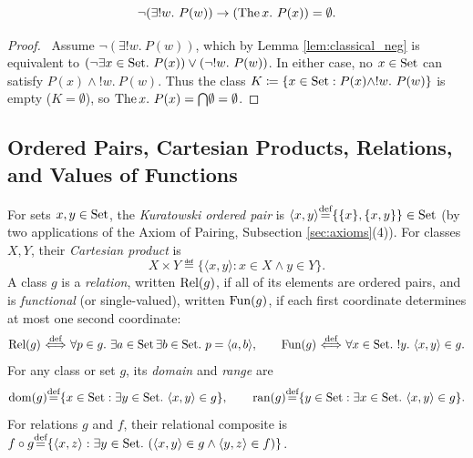 \documentclass[10pt,a4paper]{article}
\renewcommand{\myprf}{\begin{proof}}
\renewcommand{\myqed}{\end{proof}}
\begin{document}
\begin{lemma}\label{lem:the_default}
$$\neg (\exists !w.\ P(w)) \to ({\textrm{The\,}} x.\ P(x)) = \emptyset.$$
\end{lemma}
\myprf\ Assume $\neg (\exists !w.\ P(w))$, which by Lemma \ref{lem:classical_neg} is equivalent to $(\neg \exists x \in {\textrm{Set}}.\ P(x)) \lor (\neg !w.\ P(w))$. In either case, no $x \in {\textrm{Set}}$ can satisfy $P(x) \land !w.\ P(w)$. Thus the class $K \coloneqq \{x \in {\textrm{Set}} : P(x) \land !w.\ P(w)\}$ is empty ($K = \emptyset$), so ${\textrm{The\,}} x.\ P(x) = {\bigcap} \emptyset = \emptyset$. \myqed

\subsection{Ordered Pairs, Cartesian Products, Relations, and Values of Functions}\label{sec:pairs_rels}
\begin{definition}\label{def:pair_rel}
For sets $x, y \in {\textrm{Set}}$, the \emph{Kuratowski ordered pair} is $\langle x, y \rangle {\stackrel{{\textrm{def}}}{=}} \{\{x\}, \{x, y\}\} \in {\textrm{Set}}$ (by two applications of the Axiom of Pairing, Subsection \ref{sec:axioms}(4)). For classes $X, Y$, their \emph{Cartesian product} is
$$X \times Y \eqdef \{\langle x, y \rangle : x \in X \land y \in Y\}.$$
A class $g$ is a \emph{relation}, written ${\textrm{Rel}}(g)$, if all of its elements are ordered pairs, and is \emph{functional} (or single-valued), written ${\textrm{Fun}}(g)$, if each first coordinate determines at most one second coordinate:
$${\textrm{Rel}}(g) {\stackrel{{\textrm{def}}}{\ \Longleftrightarrow\ }} \forall p \in g.\ \exists a \in {\textrm{Set}}\, \exists b \in {\textrm{Set}}.\ p = \langle a,b\rangle, \qquad {\textrm{Fun}}(g) {\stackrel{{\textrm{def}}}{\ \Longleftrightarrow\ }} \forall x \in {\textrm{Set}}.\ !y.\ \langle x,y\rangle \in g.$$
For any class or set $g$, its \emph{domain} and \emph{range} are
$${\textrm{dom}}(g) {\stackrel{{\textrm{def}}}{=}} \{x \in {\textrm{Set}} : \exists y \in {\textrm{Set}}.\ \langle x, y \rangle \in g\}, \qquad {\textrm{ran}}(g) {\stackrel{{\textrm{def}}}{=}} \{y \in {\textrm{Set}} : \exists x \in {\textrm{Set}}.\ \langle x, y \rangle \in g\}.$$
For relations $g$ and $f$, their relational composite is $f \circ g {\stackrel{{\textrm{def}}}{=}} \{\langle x, z \rangle : \exists y \in {\textrm{Set}}.\ (\langle x, y \rangle \in g \land \langle y, z \rangle \in f)\}$.
\end{definition}
\end{document}
